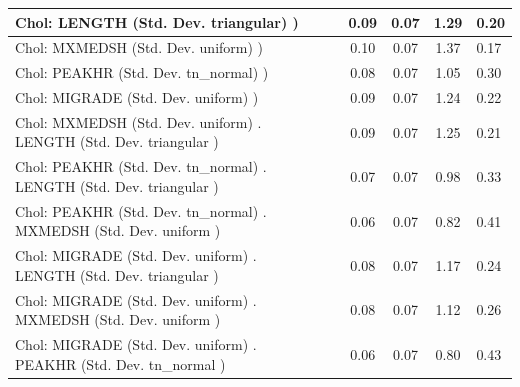 \begin{table}
\begin{center}
\begin{tabular}{|l|l|c|c|c|l|}
			\hline
			 Chol: LENGTH (Std. Dev. triangular) ) &  & 0.09 & 0.07 & 1.29 & 0.20 \\
			\hline
			 Chol: MXMEDSH (Std. Dev. uniform) ) &  & 0.10 & 0.07 & 1.37 & 0.17 \\
			\hline
			 Chol: PEAKHR (Std. Dev. tn_normal) ) &  & 0.08 & 0.07 & 1.05 & 0.30 \\
			\hline
			 Chol: MIGRADE (Std. Dev. uniform) ) &  & 0.09 & 0.07 & 1.24 & 0.22 \\
			\hline
			 Chol: MXMEDSH (Std. Dev. uniform) . LENGTH (Std. Dev.   triangular ) &  & 0.09 & 0.07 & 1.25 & 0.21 \\
			\hline
			 Chol: PEAKHR (Std. Dev. tn_normal) . LENGTH (Std. Dev.   triangular ) &  & 0.07 & 0.07 & 0.98 & 0.33 \\
			\hline
			 Chol: PEAKHR (Std. Dev. tn_normal) . MXMEDSH (Std. Dev.   uniform ) &  & 0.06 & 0.07 & 0.82 & 0.41 \\
			\hline
			 Chol: MIGRADE (Std. Dev. uniform) . LENGTH (Std. Dev.   triangular ) &  & 0.08 & 0.07 & 1.17 & 0.24 \\
			\hline
			 Chol: MIGRADE (Std. Dev. uniform) . MXMEDSH (Std. Dev.   uniform ) &  & 0.08 & 0.07 & 1.12 & 0.26 \\
			\hline
			 Chol: MIGRADE (Std. Dev. uniform) . PEAKHR (Std. Dev.   tn_normal ) &  & 0.06 & 0.07 & 0.80 & 0.43 \\
			\hline
		\end{tabular}
	\end{center}
\end{table}